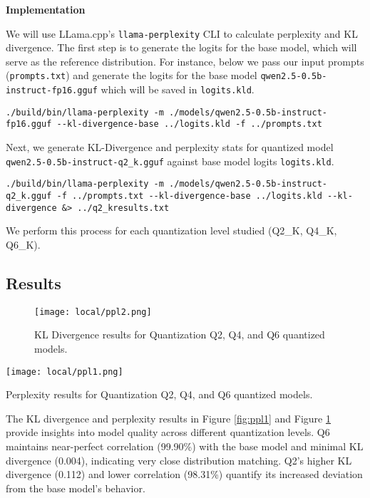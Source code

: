 \textbf{Implementation}

We will use LLama.cpp's \texttt{llama-perplexity} CLI to calculate perplexity and KL divergence. The first step is to generate the logits for the base model, which will serve as the reference distribution. For instance, below we pass our input prompts (\texttt{prompts.txt}) and generate the logits for the base model \texttt{qwen2.5-0.5b-instruct-fp16.gguf} which will be saved in \texttt{logits.kld}.

\begin{verbatim}
./build/bin/llama-perplexity -m ./models/qwen2.5-0.5b-instruct-fp16.gguf --kl-divergence-base ../logits.kld -f ../prompts.txt
\end{verbatim}

Next, we generate KL-Divergence and perplexity stats for quantized model \texttt{qwen2.5-0.5b-instruct-q2\_k.gguf} against base model logits \texttt{logits.kld}.

\begin{verbatim}
./build/bin/llama-perplexity -m ./models/qwen2.5-0.5b-instruct-q2_k.gguf -f ../prompts.txt --kl-divergence-base ../logits.kld --kl-divergence &> ../q2_kresults.txt
\end{verbatim}

We perform this process for each quantization level studied (Q2\_K, Q4\_K, Q6\_K).

\subsection{Results}
\begin{figure}[H]
\centering
\texttt{[image: local/ppl2.png]}
\caption{KL Divergence results for Quantization Q2, Q4, and Q6 quantized models.}
\label{fig:ppl2}
\end{figure}

\begin{marginfigure}
\centering
\texttt{[image: local/ppl1.png]}
\caption{Perplexity results for Quantization Q2, Q4, and Q6 quantized models.}
\label{fig:ppl1}
\end{marginfigure}

The KL divergence and perplexity results in Figure \ref{fig:ppl1} and Figure \ref{fig:ppl2} provide insights into model quality across different quantization levels. Q6 maintains near-perfect correlation (99.90\%) with the base model and minimal KL divergence (0.004), indicating very close distribution matching. Q2's higher KL divergence (0.112) and lower correlation (98.31\%) quantify its increased deviation from the base model's behavior.



